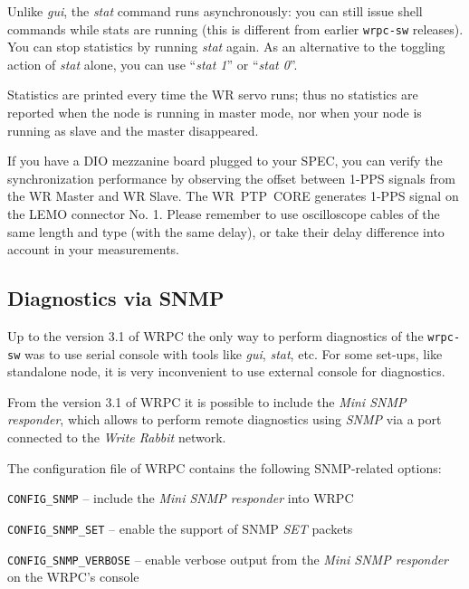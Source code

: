 \documentclass[a4paper, 12pt]{article}
\newcommand{\codeHook}[1]{\mbox{\ttfamily\MakeTextUppercase{#1}}}
\begin{document}
\vspace{1em}
Unlike \textit{gui}, the \textit{stat} command runs asynchronously: you can still
issue shell commands while stats are running (this is different from
earlier \texttt{wrpc-sw} releases).  You can stop statistics by running \textit{stat} again.
As an alternative to the toggling action of \textit{stat} alone, you can
use ``\textit{stat 1}'' or ``\textit{stat 0}''.

Statistics are printed every time the WR servo runs; thus no statistics
are reported when the node is running in master mode, nor when your node
is running as slave and the master disappeared.

\vspace{1em}
If you have a \codeHook{dio} mezzanine board plugged to your \codeHook{spec}, you can verify
the synchronization performance by observing the offset between 1-PPS signals
from the \codeHook{wr} Master and \codeHook{wr} Slave. The \codeHook{wr ptp core} generates 1-PPS
signal on the LEMO connector No. 1. Please remember to use oscilloscope cables
of the same length and type (with the same delay), or take their delay
difference into account in your measurements.


\subsection{Diagnostics via SNMP}
\label{Diagnostics via SNMP}

Up to the version 3.1 of \codeHook{wrpc} the only way to perform diagnostics
of the \texttt{wrpc-sw} was to use serial console with tools like \textit{gui}, \textit{stat},
etc. For some set-ups, like standalone node, it is very inconvenient to use
external console for diagnostics.

From the version 3.1 of \codeHook{wrpc} it is possible to include the \textit{Mini
SNMP responder}, which allows to perform remote diagnostics using \textit{SNMP} via
a port connected to the \textit{Write Rabbit} network.

The configuration file of \codeHook{wrpc} contains the following
SNMP-related options:
\begin{itemize*}
\item \texttt{CONFIG\_SNMP} -- include the \textit{Mini SNMP responder} into \codeHook{wrpc}
\item \texttt{CONFIG\_SNMP\_SET} -- enable the support of SNMP \textit{SET} packets
\item \texttt{CONFIG\_SNMP\_VERBOSE} -- enable verbose output from the \textit{Mini SNMP
      responder} on the \codeHook{wrpc}'s console
\end{itemize*}
\end{document}
